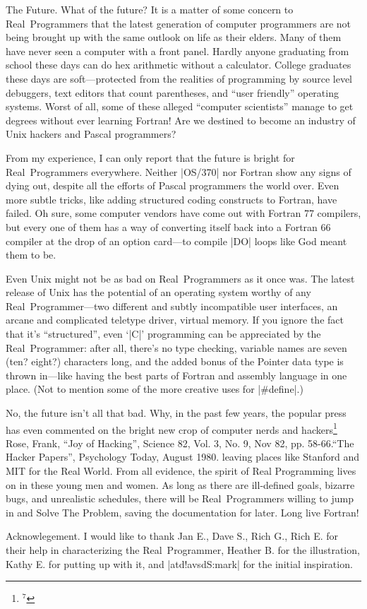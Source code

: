 \sect The Future.
What of the future? It is a matter of some concern to Real~Programmers
that the latest generation of computer programmers are not being
brought up with the same outlook on life as their elders. Many of them
have never seen a computer with a front panel. Hardly anyone
graduating from school these days can do hex arithmetic without a
calculator. College graduates these days are soft---protected from the
realities of programming by source level debuggers, text editors that
count parentheses, and ``user friendly'' operating systems. Worst of
all, some of these alleged ``computer scientists'' manage to get degrees
without ever learning Fortran! Are we destined to become an industry
of Unix hackers and Pascal programmers?

From my experience, I can only report that the future is bright for
Real~Programmers everywhere. Neither |OS/370| nor Fortran show any signs
of dying out, despite all the efforts of Pascal programmers the
world over. Even more subtle tricks, like adding structured coding
constructs to Fortran, have failed. Oh sure, some computer vendors
have come out with Fortran 77 compilers, but every one of them has a
way of converting itself back into a Fortran 66 compiler at the drop
of an option card---to compile |DO| loops like God meant them to be.

Even Unix might not be as bad on Real~Programmers as it once was. The
latest release of Unix has the potential of an operating system worthy
of any Real~Programmer---two different and subtly incompatible user
interfaces, an arcane and complicated teletype driver, virtual
memory. If you ignore the fact that it's ``structured'', even `|C|'
programming can be appreciated by the Real~Programmer: after all,
there's no type checking, variable names are seven (ten? eight?)
characters long, and the added bonus of the Pointer data type is
thrown in---like having the best parts of Fortran and assembly
language in one place. (Not to mention some of the more creative uses
for |\#define|.)

No, the future isn't all that bad. Why, in the past few years, the
popular press has even commented on the bright new crop of computer
nerds and hackers\footnote{$^7$}{%
Rose, Frank, ``Joy of Hacking'', Science 82, Vol. 3, No. 9, Nov 82, pp. 58-66.\hfil\break ``The Hacker Papers'', Psychology Today, August 1980.} leaving
places like Stanford and MIT
for the Real World. From all evidence, the spirit of Real Programming
lives on in these young men and women. As long as there are
ill-defined goals, bizarre bugs, and unrealistic schedules, there will
be Real~Programmers willing to jump in and Solve The Problem, saving
the documentation for later. Long live Fortran!

\sect Acknowlegement.
I would like to thank Jan E., Dave S., Rich G., Rich E. for their help
in characterizing the Real~Programmer, Heather B. for the
illustration, Kathy E. for putting up with it, and |atd!avsdS:mark| for
the initial inspiration.

\bye
